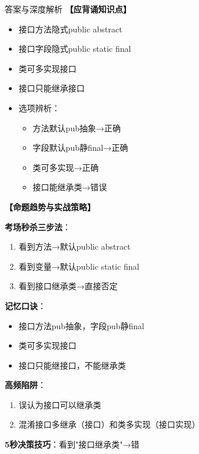 \documentclass[12pt, a4paper]{ctexart}
\begin{document}
\begin{enumerate}[label=\textbf{\arabic*.}]
\begin{bluebox}{答案与深度解析}
		      \textbf{【应背诵知识点】}
		      \begin{itemize}[label={}, nosep]
			      \item 接口方法隐式public abstract
			      \item 接口字段隐式public static final
			      \item 类可多实现接口
			      \item 接口只能继承接口
			      \item 选项辨析：
			            \begin{itemize}[label={}, nosep]
				            \item 方法默认pub抽象→正确
				            \item 字段默认pub静final→正确
				            \item 类可多实现→正确
				            \item 接口能继承类→错误
			            \end{itemize}
		      \end{itemize}

		      \textbf{【命题趋势与实战策略】}

		      \textbf{考场秒杀三步法}：
		      \begin{enumerate}[label={}, nosep]
			      \item 看到方法→默认public abstract
			      \item 看到变量→默认public static final
			      \item 看到接口继承类→直接否定
		      \end{enumerate}

		      \textbf{记忆口诀}：
		      \begin{itemize}[label={}, nosep]
			      \item 接口方法pub抽象，字段pub静final
			      \item 类可多实现接口
			      \item 接口只能继接口，不能继承类
		      \end{itemize}

		      \textbf{高频陷阱}：
		      \begin{enumerate}[label={}, nosep]
			      \item 误认为接口可以继承类
			      \item 混淆接口多继承（接口）和类多实现（接口实现）
		      \end{enumerate}

		      \textbf{5秒决策技巧}：看到"接口继承类"→错
	      \end{bluebox}

\end{enumerate}
\end{document}
